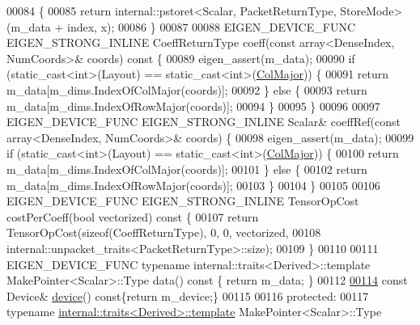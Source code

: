 \begin{DoxyCode}
00084   \{
00085     \textcolor{keywordflow}{return} internal::pstoret<Scalar, PacketReturnType, StoreMode>(m\_data + index, x);
00086   \}
00087 
00088   EIGEN\_DEVICE\_FUNC EIGEN\_STRONG\_INLINE CoeffReturnType coeff(\textcolor{keyword}{const} array<DenseIndex, NumCoords>& coords)\textcolor{keyword}{
       const }\{
00089     eigen\_assert(m\_data);
00090     \textcolor{keywordflow}{if} (static\_cast<int>(Layout) == static\_cast<int>(\hyperlink{group__enums_ggaacded1a18ae58b0f554751f6cdf9eb13a0cbd4bdd0abcfc0224c5fcb5e4f6669a}{ColMajor})) \{
00091       \textcolor{keywordflow}{return} m\_data[m\_dims.IndexOfColMajor(coords)];
00092     \} \textcolor{keywordflow}{else} \{
00093       \textcolor{keywordflow}{return} m\_data[m\_dims.IndexOfRowMajor(coords)];
00094     \}
00095   \}
00096 
00097   EIGEN\_DEVICE\_FUNC EIGEN\_STRONG\_INLINE Scalar& coeffRef(\textcolor{keyword}{const} array<DenseIndex, NumCoords>& coords) \{
00098     eigen\_assert(m\_data);
00099     \textcolor{keywordflow}{if} (static\_cast<int>(Layout) == static\_cast<int>(\hyperlink{group__enums_ggaacded1a18ae58b0f554751f6cdf9eb13a0cbd4bdd0abcfc0224c5fcb5e4f6669a}{ColMajor})) \{
00100       \textcolor{keywordflow}{return} m\_data[m\_dims.IndexOfColMajor(coords)];
00101     \} \textcolor{keywordflow}{else} \{
00102       \textcolor{keywordflow}{return} m\_data[m\_dims.IndexOfRowMajor(coords)];
00103     \}
00104   \}
00105 
00106   EIGEN\_DEVICE\_FUNC EIGEN\_STRONG\_INLINE TensorOpCost costPerCoeff(\textcolor{keywordtype}{bool} vectorized)\textcolor{keyword}{ const }\{
00107     \textcolor{keywordflow}{return} TensorOpCost(\textcolor{keyword}{sizeof}(CoeffReturnType), 0, 0, vectorized,
00108                         internal::unpacket\_traits<PacketReturnType>::size);
00109   \}
00110 
00111   EIGEN\_DEVICE\_FUNC \textcolor{keyword}{typename} internal::traits<Derived>::template MakePointer<Scalar>::Type data()\textcolor{keyword}{ const }\{ \textcolor{keywordflow}{
      return} m\_data; \}
00112 
\hyperlink{struct_eigen_1_1_tensor_evaluator_a98b51809ed8f7a1f736eb7b952b9636e}{00114}   \textcolor{keyword}{const} Device& \hyperlink{struct_eigen_1_1_tensor_evaluator_a98b51809ed8f7a1f736eb7b952b9636e}{device}()\textcolor{keyword}{ const}\{\textcolor{keywordflow}{return} m\_device;\}
00115 
00116  \textcolor{keyword}{protected}:
00117   \textcolor{keyword}{typename} \hyperlink{struct_eigen_1_1internal_1_1traits}{internal::traits<Derived>::template} MakePointer<Scalar>::Type

\end{DoxyCode}
